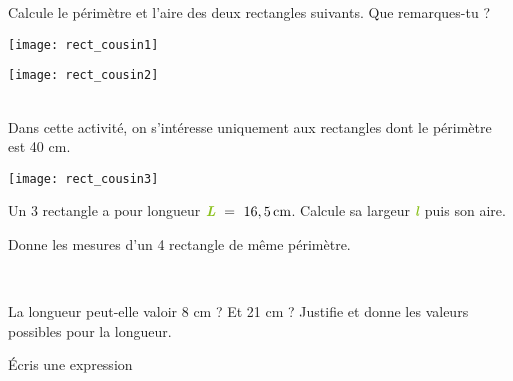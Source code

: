 
\begin{activite}

\begin{partie}
Calcule le périmètre et l'aire des deux rectangles suivants. Que remarques-tu ?

\begin{minipage}[c]{0.48\linewidth}
 \begin{center} \texttt{[image: rect\_cousin1]} \end{center}
 \end{minipage} \hfill%
 \begin{minipage}[c]{0.48\linewidth}
 \begin{center} \texttt{[image: rect\_cousin2]} \end{center}
  \end{minipage}\\[0.5em]
Dans cette activité, on s'intéresse uniquement aux rectangles dont le périmètre est 40 cm.
\end{partie}


\begin{minipage}[c]{0.28\linewidth}
 \texttt{[image: rect\_cousin3]}
 \end{minipage} \hfill%
 \begin{minipage}[c]{0.64\linewidth}
\begin{partie}
Un 3 rectangle a pour longueur $\emph{\textbf{\textcolor{H1}{L}}} = 16,5\,\text{cm}$. Calcule sa largeur $\emph{\textbf{\textcolor{H1}{l}}}$ puis son aire.
\end{partie}

\begin{partie}
Donne les mesures d'un 4 rectangle de même périmètre.
\end{partie}
  \end{minipage} \\

\begin{partie}
La longueur peut-elle valoir 8 cm ? Et 21 cm ? Justifie et donne les valeurs possibles pour la longueur.
\end{partie}

\begin{partie}
Écris une expression %
\end{partie}


\end{activite}
